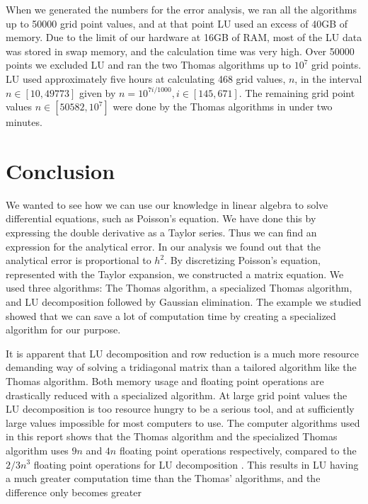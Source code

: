 \documentclass{emulateapj}
\begin{document}
        When we generated the numbers for the error analysis, we ran all the algorithms up to 50000 grid point values, and at that point LU used an excess of 40GB of memory. Due to the limit of our hardware at 16GB of RAM, most of the LU data was stored in swap memory, and the calculation time was very high. Over 50000 points we excluded LU and ran the two Thomas algorithms up to $10^7$ grid points. LU used approximately five hours at calculating 468 grid values, $n$, in the interval $n \in [10, 49773]$ given by $n = 10^{7i/1000}, i \in [145, 671]$. The remaining grid point values $n \in [50582, 10^7]$ were done by the Thomas algorithms in under two minutes.
            


\section{Conclusion}
    We wanted to see how we can use our knowledge in linear algebra to solve differential equations, such as Poisson's equation. We have done this by expressing the double derivative as a Taylor series. Thus we can find an expression for the analytical error. In our analysis we found out that the analytical error is proportional to $h^2$. By discretizing Poisson's equation, represented with the Taylor expansion, we constructed a matrix equation. We used three algorithms: The Thomas algorithm, a specialized Thomas algorithm, and LU decomposition followed by Gaussian elimination. The example we studied showed that we can save a lot of computation time by creating a specialized algorithm for our purpose. 

    It is apparent that LU decomposition and row reduction is a much more resource demanding way of solving a tridiagonal matrix than a tailored algorithm like the Thomas algorithm. Both memory usage and floating point operations are drastically reduced with a specialized algorithm. At large grid point values the LU decomposition is too resource hungry to be a serious tool, and at sufficiently large values impossible for most computers to use. The computer algorithms used in this report shows that the Thomas algorithm and the specialized Thomas algorithm uses $9n$ and $4n$ floating point operations respectively, compared to the $2/3n^3$ floating point operations for LU decomposition \cite[Chapter 2]{linalg}. This results in LU having a much greater computation time than the Thomas' algorithms, and the difference only becomes greater 
    
\end{document}
